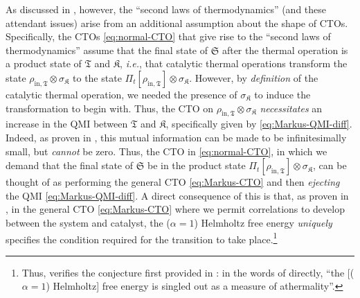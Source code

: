 \documentclass[preprints,article,accept,moreauthors,pdftex]{Definitions/mdpi}
\begin{document}
\begin{paracol}{2}
As discussed in \cite{Mueller18}, however, the ``second laws of thermodynamics'' (and these attendant issues) arise from an additional assumption about the shape of CTOs. Specifically, the CTOs \eqref{eq:normal-CTO} that give rise to the ``second laws of thermodynamics'' assume that the final state of $\mathfrak{S}$ after the thermal operation is a product state of $\mathfrak{T}$ and $\mathfrak{K}$, \emph{i.e.}, that catalytic thermal operations transform the state $\rho_{\mathrm{in},\mathfrak{T}} \otimes \sigma_{\mathfrak{K}}$ to the state $\Pi_{t} \left[\rho_{\mathrm{in},\mathfrak{T}}\right] \otimes \sigma_{\mathfrak{K}}$. However, by \emph{definition} of the catalytic thermal operation, we needed the presence of $\sigma_{\mathfrak{K}}$ to induce the transformation to begin with. Thus, the CTO on $\rho_{\mathrm{in},\mathfrak{T}} \otimes \sigma_{\mathfrak{K}}$ \emph{necessitates} an increase in the QMI between $\mathfrak{T}$ and $\mathfrak{K}$, specifically given by \eqref{eq:Markus-QMI-diff}. Indeed, as proven in \cite{Mueller18}, this mutual information can be made to be infinitesimally small, but \emph{cannot} be zero. Thus, the CTO in \eqref{eq:normal-CTO}, in which we demand that the final state of $\mathfrak{S}$ be in the product state $\Pi_{t} \left[\rho_{\mathrm{in},\mathfrak{T}}\right] \otimes \sigma_{\mathfrak{K}}$, can be thought of as performing the general CTO \eqref{eq:Markus-CTO} and then \emph{ejecting} the QMI \eqref{eq:Markus-QMI-diff}. A direct consequence of this is that, as proven in \cite{Mueller18}, in the general CTO \eqref{eq:Markus-CTO} where we permit correlations to develop between the system and catalyst, the ($\alpha = 1$) Helmholtz free energy \emph{uniquely} specifies the condition required for the transition to take place.\footnote{Thus, \cite{Mueller18} verifies the conjecture first provided in \cite{WGE17}: in the words of \cite{WGE17} directly, ``the [($\alpha = 1$) Helmholtz] free energy is singled out as a measure of athermality''.}


\end{paracol}
\end{document}
